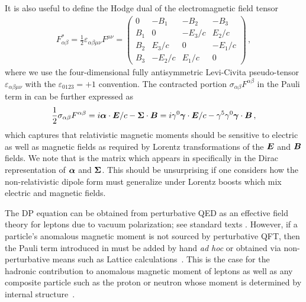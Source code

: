 It is also useful to define the Hodge dual of the electromagnetic field tensor
\begin{gather}
    \label{em:2}
    F_{\alpha\beta}^{*} = \frac{1}{2}\varepsilon_{\alpha\beta\mu\nu}F^{\mu\nu} = 
    \begin{pmatrix}
        0        & -B_{1}  & -B_{2}  & -B_{3}\\
        B_{1}  & 0         & -E_{3}/c    & E_{2}/c\\
        B_{2}  & E_{3}/c     & 0         & -E_{1}/c\\
        B_{3}  & -E_{2}/c    & E_{1}/c     & 0
    \end{pmatrix}\,,
\end{gather}
where we use the four-dimensional fully antisymmetric Levi-Civita pseudo-tensor $\varepsilon_{\alpha\beta\mu\nu}$ with the $\varepsilon_{0123}=+1$ convention. The contracted portion $\sigma_{\alpha\beta}F^{\alpha\beta}$ in the Pauli term in  can be further expressed as
\begin{alignat}{1}
	\label{dp:2} \frac{1}{2}\sigma_{\alpha\beta}F^{\alpha\beta} = i\boldsymbol{\alpha}\cdot\boldsymbol{E}/c-\boldsymbol{\Sigma}\cdot\boldsymbol{B} = i\gamma^{0}\boldsymbol{\gamma}\cdot\boldsymbol{E}/c-\gamma^{5}\gamma^{0}\boldsymbol{\gamma}\cdot\boldsymbol{B}\,,
\end{alignat}
which captures that relativistic magnetic moments should be sensitive to electric as well as magnetic fields as required by Lorentz transformations of the $\boldsymbol{E}$ and $\boldsymbol{B}$ fields. We note that  is the matrix which appears in  specifically in the Dirac representation of $\boldsymbol{\alpha}$ and $\boldsymbol{\Sigma}$. This should be unsurprising if one considers how the non-relativistic dipole form must generalize under Lorentz boosts which mix electric and magnetic fields.

The DP equation can be obtained from perturbative QED as an effective field theory for leptons due to vacuum polarization; see standard texts \cite{Itzykson:1980rh,Schwartz:2014sze}. However, if a particle's anomalous magnetic moment is not sourced by perturbative QFT, then the Pauli term introduced in  must be added by hand \emph{ad hoc} or obtained via non-perturbative means such as Lattice calculations~\citep{Aoyama:2020ynm}. This is the case for the hadronic contribution to anomalous magnetic moment of leptons as well as any composite particle such as the proton or neutron whose moment is determined by internal structure~\citep{Proceedings:2012ulb}.


